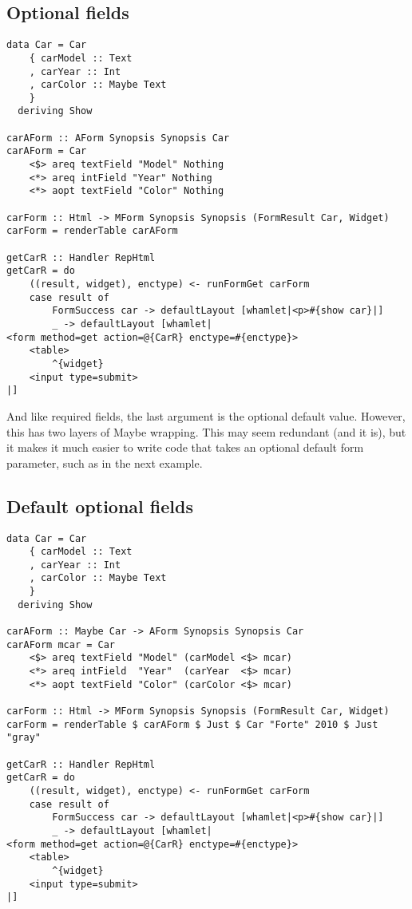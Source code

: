 \subsection{Optional fields}

\begin{lstlisting}
data Car = Car
    { carModel :: Text
    , carYear :: Int
    , carColor :: Maybe Text
    }
  deriving Show

carAForm :: AForm Synopsis Synopsis Car
carAForm = Car
    <$> areq textField "Model" Nothing
    <*> areq intField "Year" Nothing
    <*> aopt textField "Color" Nothing

carForm :: Html -> MForm Synopsis Synopsis (FormResult Car, Widget)
carForm = renderTable carAForm

getCarR :: Handler RepHtml
getCarR = do
    ((result, widget), enctype) <- runFormGet carForm
    case result of
        FormSuccess car -> defaultLayout [whamlet|<p>#{show car}|]
        _ -> defaultLayout [whamlet|
<form method=get action=@{CarR} enctype=#{enctype}>
    <table>
        ^{widget}
    <input type=submit>
|]
\end{lstlisting}

And like required fields, the last argument is the optional default value. However, this has two layers of Maybe wrapping. This may seem redundant (and it is), but it makes it much easier to write code that takes an optional default form parameter, such as in the next example.

\subsection{Default optional fields}

\begin{lstlisting}
data Car = Car
    { carModel :: Text
    , carYear :: Int
    , carColor :: Maybe Text
    }
  deriving Show

carAForm :: Maybe Car -> AForm Synopsis Synopsis Car
carAForm mcar = Car
    <$> areq textField "Model" (carModel <$> mcar)
    <*> areq intField  "Year"  (carYear  <$> mcar)
    <*> aopt textField "Color" (carColor <$> mcar)

carForm :: Html -> MForm Synopsis Synopsis (FormResult Car, Widget)
carForm = renderTable $ carAForm $ Just $ Car "Forte" 2010 $ Just "gray"

getCarR :: Handler RepHtml
getCarR = do
    ((result, widget), enctype) <- runFormGet carForm
    case result of
        FormSuccess car -> defaultLayout [whamlet|<p>#{show car}|]
        _ -> defaultLayout [whamlet|
<form method=get action=@{CarR} enctype=#{enctype}>
    <table>
        ^{widget}
    <input type=submit>
|]
\end{lstlisting}

